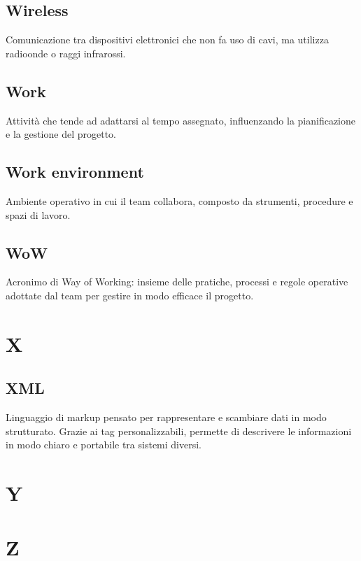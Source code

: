 \documentclass[a4paper,12pt]{article}
\begin{document}
          \subsection*{Wireless}
			Comunicazione tra dispositivi elettronici che non fa uso di cavi, ma utilizza radioonde o raggi infrarossi.
          \subsection*{Work}
			Attività che tende ad adattarsi al tempo assegnato, influenzando la pianificazione e la gestione del progetto.
          \subsection*{Work environment}
			Ambiente operativo in cui il team collabora, composto da strumenti, procedure e spazi di lavoro.
          \subsection*{WoW}
			Acronimo di Way of Working: insieme delle pratiche, processi e regole operative adottate dal team per gestire in modo efficace il progetto.          
        
\newpage
      
        \section{X}
        
          \subsection*{XML}
			Linguaggio di markup pensato per rappresentare e scambiare dati in modo strutturato. Grazie ai tag personalizzabili, permette di descrivere le informazioni in modo chiaro e portabile tra sistemi diversi.
        
\newpage
        \section{Y}
        
        
\newpage
        \section{Z}
        
\end{document}
